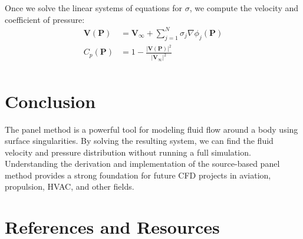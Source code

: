 \documentclass[conf]{new-aiaa} %
\begin{document}
Once we solve the linear systems of equations for $\sigma$, we compute the velocity and coefficient of pressure:
\begin{align}
\mathbf{V}(\mathbf{P}) &= \mathbf{V}_\infty + \sum_{j=1}^{N} \sigma_j \nabla \phi_j (\mathbf{P}) \\
C_p(\mathbf{P}) &= 1 - \frac{\lvert \mathbf{V}(\mathbf{P}) \rvert^2}{\lvert \mathbf{V}_\infty \rvert^2} \\
\label{eq:vel_cp}
\end{align}

\section{Conclusion}
The panel method is a powerful tool for modeling fluid flow around a body using surface singularities. 
By solving the resulting system, we can find the fluid velocity and pressure distribution without running a full simulation. 
Understanding the derivation and implementation of the source-based panel method provides a strong foundation for future CFD projects in aviation, propulsion, HVAC, and other fields.



\section{References and Resources}

\nocite{*}


\end{document}
